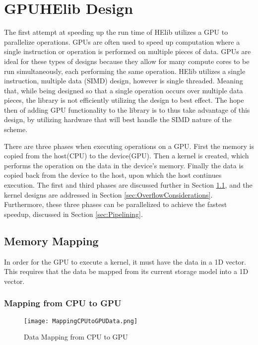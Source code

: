 \chapter{GPUHElib Design} \label{chap:GPUHElibDesign}
The first attempt at speeding up the run time of HElib utilizes a GPU to parallelize operations. GPUs are often used to speed up computation where a single instruction or operation is performed on multiple pieces of data. GPUs are ideal for these types of designs because they allow for many compute cores to be run simultaneously, each performing the same operation. HElib utilizes a single instruction, multiple data (SIMD) design, however is single threaded. Meaning that, while being designed so that a single operation occurs over multiple data pieces, the library is not efficiently utilizing the design to best effect. The hope then of adding GPU functionality to the library is to thus take advantage of this design, by utilizing hardware that will best handle the SIMD nature of the scheme. 

There are three phases when executing operations on a GPU. First the memory is copied from the host(CPU) to the device(GPU). Then a kernel is created, which performs the operation on the data in the device's memory. Finally the data is copied back from the device to the host, upon which the host continues execution. The first and third phases are discussed further in Section \ref{sec:MemoryMapping}, and the kernel designs are addressed in Section \ref{sec:OverflowConsiderations}. Furthermore, these three phases can be parallelized to achieve the fastest speedup, discussed in Section \ref{sec:Pipelining}.

\section{Memory Mapping} \label{sec:MemoryMapping}
In order for the GPU to execute a kernel, it must have the data in a 1D vector. This requires that the data be mapped from its current storage model into a 1D vector.

\subsection{Mapping from CPU to GPU}

\begin{figure}[htp]
\centering
\texttt{[image: MappingCPUtoGPUData.png]}
\caption{Data Mapping from CPU to GPU}
\label{fig:MappingCPUtoGPUData}
\end{figure}

